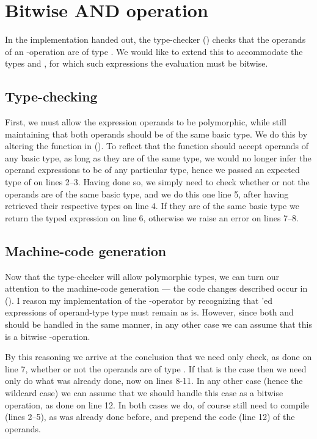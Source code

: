 %
%
%

\section{Bitwise AND operation}
In the implementation handed out, the type-checker () checks
that the operands of an -operation are of type . We would
like to extend this to accommodate the types  and , for
which such expressions the evaluation must be bitwise.

\subsection{Type-checking}
First, we must allow the expression operands to be polymorphic, while still
maintaining that both operands should be of the same basic type. We do this by
altering the  function in 
(). To reflect that the
function should accept operands of any basic type, as long as they are of the
same type, we would no longer infer the operand expressions to be of any
particular type, hence we passed an expected type of  on
lines 2--3. Having done so, we simply need to check whether or not the
operands are of the same basic type, and we do this one line 5, after having
retrieved their respective types on line 4. If they are of the same basic
type we return the typed expression on line 6, otherwise we raise an error on
lines 7--8. 

\subsection{Machine-code generation}
Now that the type-checker will allow polymorphic types, we can turn our
attention to the machine-code generation --- the code changes described occur
in  (). I
reason my implementation of the -operator by recognizing that
'ed expressions of operand-type  type must remain as is.
However, since both  and  should be handled in the same
manner, in any other case we can assume that this is a bitwise
-operation.

By this reasoning we arrive at the conclusion that we need only check, as
done on line 7, whether or not the operands are of type . If that
is the case then we need only do what was already done, now on lines 8-11. In
any other case (hence the wildcard case) we can assume that we should handle
this case as a bitwise operation, as done on line 12. In both cases we do, of
course still need to compile (lines 2--5), as was already done before, and
prepend the code (line 12) of the operands.

